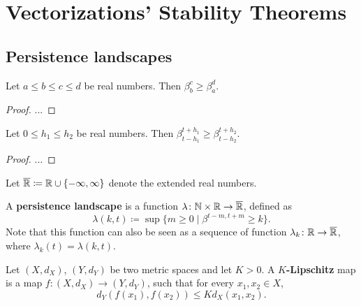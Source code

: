 
\chapter{Vectorizations' Stability Theorems}

\section{Persistence landscapes}

\begin{lemma} \label{lemma:landscapes-aux-1}
    Let $ a \leq b \leq c \leq d $ be real numbers. Then $ \beta_b^c \geq \beta_a^d $.
\end{lemma}
\begin{proof}
    ...
\end{proof}

\begin{lemma} \label{lemma:landscapes-aux-2}
    Let $ 0 \leq h_1 \leq h_2 $ be real numbers. Then $ \beta_{t-h_1}^{t+h_1} \geq \beta_{t-h_2}^{t+h_2} $.
\end{lemma}
\begin{proof}
    ...
\end{proof}

Let $ \overline{\mathbb R} \coloneq \mathbb R \cup \{-\infty, \infty\} $ denote the extended real numbers. 

\begin{definition} 
    A {\bf persistence landscape} is a function $ \lambda \colon \mathbb N \times \mathbb R \to \overline {\mathbb R} $, defined as
    \begin{equation}
        \lambda(k, t) \coloneq \sup \{ m \geq 0 \mid \beta^{t-m, t+m} \geq k\}.
    \end{equation}
    Note that this function can also be seen as a sequence of function $ \lambda_k \colon \mathbb R \to \overline{\mathbb R} $, where $ \lambda_k(t) = \lambda(k, t) $.
\end{definition}

\begin{definition}[$K$-Lipschitz]
    Let $ (X, d_X) $, $ (Y, d_Y) $ be two metric spaces and let $ K > 0 $. A {\bf $K$-Lipschitz} map is a map $ f \colon (X, d_X) \to (Y, d_Y) $, such that for every $ x_1, x_2 \in X $, 
    \begin{equation}
        d_Y(f(x_1), f(x_2)) \leq K d_X(x_1, x_2).
    \end{equation}
\end{definition}


